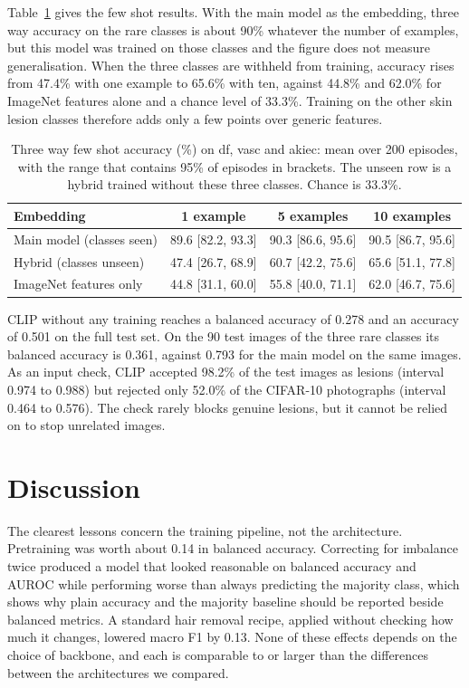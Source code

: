 \documentclass[runningheads]{llncs}
\begin{document}
Table~\ref{tab:fewshot} gives the few shot results. With the main model as the embedding, three way accuracy on the rare classes is about 90\% whatever the number of examples, but this model was trained on those classes and the figure does not measure generalisation. When the three classes are withheld from training, accuracy rises from 47.4\% with one example to 65.6\% with ten, against 44.8\% and 62.0\% for ImageNet features alone and a chance level of 33.3\%. Training on the other skin lesion classes therefore adds only a few points over generic features.

\begin{table}[!htbp]
\centering
\caption{Three way few shot accuracy (\%) on df, vasc and akiec: mean over 200 episodes, with the range that contains 95\% of episodes in brackets. The unseen row is a hybrid trained without these three classes. Chance is 33.3\%.}
\label{tab:fewshot}
\small\setlength{\tabcolsep}{4pt}
\begin{tabular}{lccc}
\toprule
Embedding & 1 example & 5 examples & 10 examples \\
\midrule
Main model (classes seen) & 89.6 [82.2, 93.3] & 90.3 [86.6, 95.6] & 90.5 [86.7, 95.6] \\
Hybrid (classes unseen)   & 47.4 [26.7, 68.9] & 60.7 [42.2, 75.6] & 65.6 [51.1, 77.8] \\
ImageNet features only    & 44.8 [31.1, 60.0] & 55.8 [40.0, 71.1] & 62.0 [46.7, 75.6] \\
\bottomrule
\end{tabular}
\end{table}

CLIP without any training reaches a balanced accuracy of 0.278 and an accuracy of 0.501 on the full test set. On the 90 test images of the three rare classes its balanced accuracy is 0.361, against 0.793 for the main model on the same images. As an input check, CLIP accepted 98.2\% of the test images as lesions (interval 0.974 to 0.988) but rejected only 52.0\% of the CIFAR-10 photographs (interval 0.464 to 0.576). The check rarely blocks genuine lesions, but it cannot be relied on to stop unrelated images.

\section{Discussion}

The clearest lessons concern the training pipeline, not the architecture. Pretraining was worth about 0.14 in balanced accuracy. Correcting for imbalance twice produced a model that looked reasonable on balanced accuracy and AUROC while performing worse than always predicting the majority class, which shows why plain accuracy and the majority baseline should be reported beside balanced metrics. A standard hair removal recipe, applied without checking how much it changes, lowered macro F1 by 0.13. None of these effects depends on the choice of backbone, and each is comparable to or larger than the differences between the architectures we compared.
\end{document}
